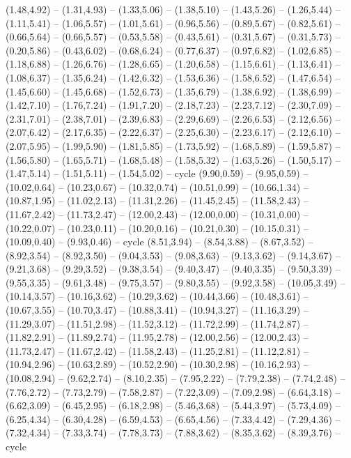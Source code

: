 \expandafter\def\csname geo:gebiet:1938-Netherlands\endcsname{
  (1.48,4.92) -- (1.31,4.93) -- (1.33,5.06) -- (1.38,5.10) -- (1.43,5.26) -- (1.26,5.44) -- (1.11,5.41) -- (1.06,5.57) -- (1.01,5.61) -- (0.96,5.56) -- (0.89,5.67) -- (0.82,5.61) -- (0.66,5.64) -- (0.66,5.57) -- (0.53,5.58) -- (0.43,5.61) -- (0.31,5.67) -- (0.31,5.73) -- (0.20,5.86) -- (0.43,6.02) -- (0.68,6.24) -- (0.77,6.37) -- (0.97,6.82) -- (1.02,6.85) -- (1.18,6.88) -- (1.26,6.76) -- (1.28,6.65) -- (1.20,6.58) -- (1.15,6.61) -- (1.13,6.41) -- (1.08,6.37) -- (1.35,6.24) -- (1.42,6.32) -- (1.53,6.36) -- (1.58,6.52) -- (1.47,6.54) -- (1.45,6.60) -- (1.45,6.68) -- (1.52,6.73) -- (1.35,6.79) -- (1.38,6.92) -- (1.38,6.99) -- (1.42,7.10) -- (1.76,7.24) -- (1.91,7.20) -- (2.18,7.23) -- (2.23,7.12) -- (2.30,7.09) -- (2.31,7.01) -- (2.38,7.01) -- (2.39,6.83) -- (2.29,6.69) -- (2.26,6.53) -- (2.12,6.56) -- (2.07,6.42) -- (2.17,6.35) -- (2.22,6.37) -- (2.25,6.30) -- (2.23,6.17) -- (2.12,6.10) -- (2.07,5.95) -- (1.99,5.90) -- (1.81,5.85) -- (1.73,5.92) -- (1.68,5.89) -- (1.59,5.87) -- (1.56,5.80) -- (1.65,5.71) -- (1.68,5.48) -- (1.58,5.32) -- (1.63,5.26) -- (1.50,5.17) -- (1.47,5.14) -- (1.51,5.11) -- (1.54,5.02) -- cycle}
\expandafter\def\csname geo:gebiet:1938-Romania\endcsname{
  (9.90,0.59) -- (9.95,0.59) -- (10.02,0.64) -- (10.23,0.67) -- (10.32,0.74) -- (10.51,0.99) -- (10.66,1.34) -- (10.87,1.95) -- (11.02,2.13) -- (11.31,2.26) -- (11.45,2.45) -- (11.58,2.43) -- (11.67,2.42) -- (11.73,2.47) -- (12.00,2.43) -- (12.00,0.00) -- (10.31,0.00) -- (10.22,0.07) -- (10.23,0.11) -- (10.20,0.16) -- (10.21,0.30) -- (10.15,0.31) -- (10.09,0.40) -- (9.93,0.46) -- cycle}
\expandafter\def\csname geo:gebiet:1938-Czechoslovakia\endcsname{
  (8.51,3.94) -- (8.54,3.88) -- (8.67,3.52) -- (8.92,3.54) -- (8.92,3.50) -- (9.04,3.53) -- (9.08,3.63) -- (9.13,3.62) -- (9.14,3.67) -- (9.21,3.68) -- (9.29,3.52) -- (9.38,3.54) -- (9.40,3.47) -- (9.40,3.35) -- (9.50,3.39) -- (9.55,3.35) -- (9.61,3.48) -- (9.75,3.57) -- (9.80,3.55) -- (9.92,3.58) -- (10.05,3.49) -- (10.14,3.57) -- (10.16,3.62) -- (10.29,3.62) -- (10.44,3.66) -- (10.48,3.61) -- (10.67,3.55) -- (10.70,3.47) -- (10.88,3.41) -- (10.94,3.27) -- (11.16,3.29) -- (11.29,3.07) -- (11.51,2.98) -- (11.52,3.12) -- (11.72,2.99) -- (11.74,2.87) -- (11.82,2.91) -- (11.89,2.74) -- (11.95,2.78) -- (12.00,2.56) -- (12.00,2.43) -- (11.73,2.47) -- (11.67,2.42) -- (11.58,2.43) -- (11.25,2.81) -- (11.12,2.81) -- (10.94,2.96) -- (10.63,2.89) -- (10.52,2.90) -- (10.30,2.98) -- (10.16,2.93) -- (10.08,2.94) -- (9.62,2.74) -- (8.10,2.35) -- (7.95,2.22) -- (7.79,2.38) -- (7.74,2.48) -- (7.76,2.72) -- (7.73,2.79) -- (7.58,2.87) -- (7.22,3.09) -- (7.09,2.98) -- (6.64,3.18) -- (6.62,3.09) -- (6.45,2.95) -- (6.18,2.98) -- (5.46,3.68) -- (5.44,3.97) -- (5.73,4.09) -- (6.25,4.34) -- (6.30,4.28) -- (6.59,4.53) -- (6.65,4.56) -- (7.33,4.42) -- (7.29,4.36) -- (7.32,4.34) -- (7.33,3.74) -- (7.78,3.73) -- (7.88,3.62) -- (8.35,3.62) -- (8.39,3.76) -- cycle}
